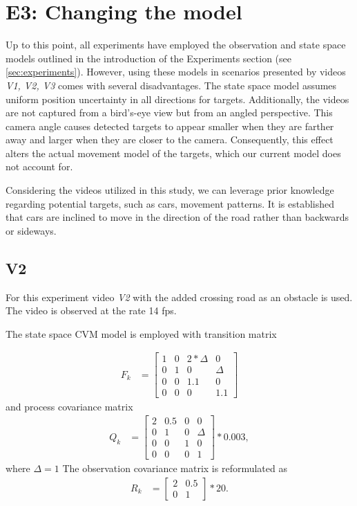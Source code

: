 \section{E3: Changing the model}
\renewcommand{\Ex}{E3}
Up to this point, all experiments have employed the observation and state space models outlined in the introduction of the Experiments section (see \ref{sec:experiments}). However, using these models in scenarios presented by videos \textit{V1, V2, V3} comes with several disadvantages. The state space model assumes uniform position uncertainty in all directions for targets. Additionally, the videos are not captured from a bird's-eye view but from an angled perspective. This camera angle causes detected targets to appear smaller when they are farther away and larger when they are closer to the camera. Consequently, this effect alters the actual movement model of the targets, which our current model does not account for.


Considering the videos utilized in this study, we can leverage prior knowledge regarding potential targets, such as cars, movement patterns. It is established that cars are inclined to move in the direction of the road rather than backwards or sideways.
\subsection{V2}
\renewcommand{\Vs}{V2}
For this experiment video \textit{V2} with the added crossing road as an obstacle is used. The video is observed at the rate 14 fps.

The state space CVM model is employed with transition matrix

\begin{align}
    F_k &=
    \begin{bmatrix}
        1 & 0 & 2*\Delta & 0\\
        0 & 1 & 0 & \Delta \\
        0 & 0 & 1.1 & 0 \\
        0 & 0 & 0 & 1.1
    \end{bmatrix}

\end{align}
and process covariance matrix
\begin{align}
    Q_k &=
    \begin{bmatrix}
        2 & 0.5 & 0 & 0\\
        0 & 1 & 0 & \Delta \\
        0 & 0 & 1 & 0 \\
        0 & 0 & 0 & 1
    \end{bmatrix}
    * 0.003,
    \label{eq:exp_E3-V2_Q}
\end{align}
where $\Delta = 1$
The observation covariance matrix is reformulated as
\begin{align}
    R_k &=
    \begin{bmatrix}
        2 & 0.5 \\
        0 & 1
    \end{bmatrix}
    * 20.
    \label{eq:exp_E3-V2_R}
\end{align}

